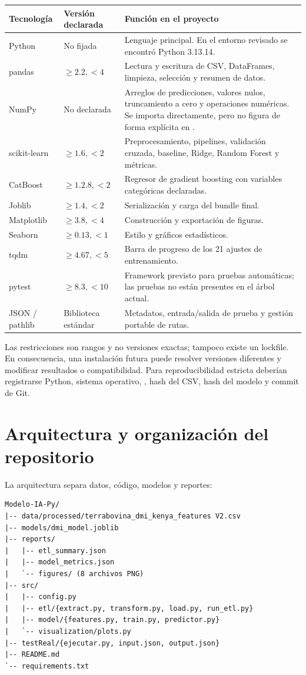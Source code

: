 \documentclass[11pt,a4paper]{article}
\newcommand{\archivo}[1]{\texttt{\detokenize{#1}}}
\begin{document}
\begin{longtable}{p{3.2cm}p{2.2cm}p{9cm}}
\toprule
\textbf{Tecnología} & \textbf{Versión declarada} & \textbf{Función en el proyecto}\\
\midrule
\endhead
Python & No fijada & Lenguaje principal. En el entorno revisado se encontró Python 3.13.14.\\
pandas & $\geq2.2,<4$ & Lectura y escritura de CSV, DataFrames, limpieza, selección y resumen de datos.\\
NumPy & No declarada & Arreglos de predicciones, valores nulos, truncamiento a cero y operaciones numéricas. Se importa directamente, pero no figura de forma explícita en \archivo{requirements.txt}.\\
scikit-learn & $\geq1.6,<2$ & Preprocesamiento, pipelines, validación cruzada, baseline, Ridge, Random Forest y métricas.\\
CatBoost & $\geq1.2.8,<2$ & Regresor de gradient boosting con variables categóricas declaradas.\\
Joblib & $\geq1.4,<2$ & Serialización y carga del bundle final.\\
Matplotlib & $\geq3.8,<4$ & Construcción y exportación de figuras.\\
Seaborn & $\geq0.13,<1$ & Estilo y gráficos estadísticos.\\
tqdm & $\geq4.67,<5$ & Barra de progreso de los 21 ajustes de entrenamiento.\\
pytest & $\geq8.3,<10$ & Framework previsto para pruebas automáticas; las pruebas no están presentes en el árbol actual.\\
JSON / pathlib & Biblioteca estándar & Metadatos, entrada/salida de prueba y gestión portable de rutas.\\
\bottomrule
\end{longtable}

Las restricciones son rangos y no versiones exactas; tampoco existe un lockfile. En consecuencia, una instalación futura puede resolver versiones diferentes y modificar resultados o compatibilidad. Para reproducibilidad estricta deberían registrarse Python, sistema operativo, \archivo{pip freeze}, hash del CSV, hash del modelo y commit de Git.

\section{Arquitectura y organización del repositorio}

La arquitectura separa datos, código, modelos y reportes:
\begin{lstlisting}
Modelo-IA-Py/
|-- data/processed/terrabovina_dmi_kenya_features V2.csv
|-- models/dmi_model.joblib
|-- reports/
|   |-- etl_summary.json
|   |-- model_metrics.json
|   `-- figures/ (8 archivos PNG)
|-- src/
|   |-- config.py
|   |-- etl/{extract.py, transform.py, load.py, run_etl.py}
|   |-- model/{features.py, train.py, predictor.py}
|   `-- visualization/plots.py
|-- testReal/{ejecutar.py, input.json, output.json}
|-- README.md
`-- requirements.txt
\end{lstlisting}
\end{document}
